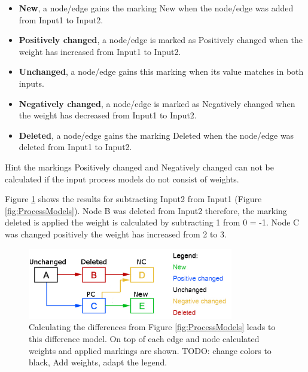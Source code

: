 \documentclass{llncs}
\begin{document}
\begin{itemize}
	\item \textbf{New}, a node/edge gains the marking New when the node/edge was added from Input1 to Input2.
	\item \textbf{Positively changed}, a node/edge is marked as Positively changed when the weight has increased from Input1 to Input2.
	\item \textbf{Unchanged}, a node/edge gains this marking when its value matches in both inputs.
	\item \textbf{Negatively changed}, a node/edge is marked as Negatively changed when the weight has decreased from Input1 to Input2.
	\item \textbf{Deleted}, a node/edge gains the marking Deleted when the node/edge was deleted from Input1 to Input2.
\end{itemize}

Hint the markings Positively changed and Negatively changed can not be calculated if the input process models do not consist of weights.

Figure \ref{fig:DiffGraphCalculation} shows the results for subtracting Input2 from Input1 (Figure \ref{fig:ProcessModels}). Node B  was deleted from Input2 therefore, the marking deleted is applied the weight is calculated by subtracting 1 from 0 = -1. Node C was changed positively the weight has increased from 2 to 3.

\begin{figure}
	\centering
	\includegraphics[width=0.8\textwidth]{Images/ResultGraph.PNG}
	\caption{Calculating the differences from Figure \ref{fig:ProcessModels} leads to this difference model. On top of each edge and node calculated weights and applied markings are shown. TODO: change colors to black, Add weights, adapt the legend.
	}
	\label{fig:DiffGraphCalculation}
\end{figure}
\end{document}
